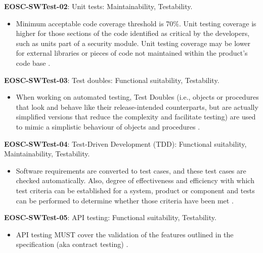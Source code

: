 \textbf{EOSC-SWTest-02}: Unit tests: Maintainability, Testability.

\begin{itemize}
    \item Minimum acceptable code coverage threshold is 70\%. Unit testing coverage is higher for those sections of the code identified as critical by the developers, such as units part of a security module. Unit testing coverage may be lower for external libraries or pieces of code not maintained within the product's code base \cite{aberdour_achieving_2007,nagappan_early_2005,boehm_quantitative_1976,shepherdson_cessda_2019,orviz_set_2017,raymond_software_2013}.
\end{itemize}

\textbf{EOSC-SWTest-03}: Test doubles: Functional suitability, Testability.

\begin{itemize}
    \item When working on automated testing,  Test Doubles (i.e., objects or procedures that look and behave like their release-intended counterparts, but are actually simplified versions that reduce the complexity and facilitate testing) are used to mimic a simplistic behaviour of objects and procedures \cite{orviz_set_2017,orviz_fernandez_eosc-synergy_2020}.
\end{itemize}

\textbf{EOSC-SWTest-04}: Test-Driven Development (TDD): Functional suitability, Maintainability, Testability.

\begin{itemize}
    \item Software requirements are converted to test cases, and these test cases are checked automatically. Also, degree of effectiveness and efficiency with which test criteria can be established for a system, product or component and tests can be performed to determine whether those criteria have been met \cite{iso_25010_2011_2017,crispin_driving_2006,zuser_software_2005,orviz_set_2017}.
\end{itemize}

\textbf{EOSC-SWTest-05}: API testing: Functional suitability, Testability.

\begin{itemize}
    \item API testing MUST cover the validation of the features outlined in the specification (aka contract testing) \cite{orviz_fernandez_eosc-synergy_2020}.
\end{itemize}

